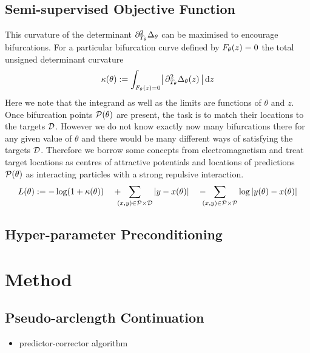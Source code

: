 \subsection{Semi-supervised Objective Function}

This curvature of the determinant $\partial_{T_{\theta}}^2\Delta_{\theta}$ can be maximised to encourage bifurcations. For a particular bifurcation curve defined by $F_{\theta}(z)=0$ the total unsigned determinant curvature
\begin{align}
    \kappa(\theta) := \int_{F_{\theta}(z)=0}\!
    \big|\,\partial_{T_{\theta}}^2\Delta_{\theta}(z)\,\big|
    \,\mathrm{d}z
\end{align}
Here we note that the integrand as well as the limits are functions of $\theta$ and $z$. Once bifurcation points $\mathcal{P}(\theta)$ are present, the task is to match their locations to the targets $\mathcal{D}$. However we do not know exactly now many bifurcations there for any given value of $\theta$ and there would be many different ways of satisfying the targets $\mathcal{D}$. Therefore we borrow some concepts from electromagnetism and treat target locations as centres of attractive potentials and locations of predictions $\mathcal{P}(\theta)$ as interacting particles with a strong repulsive interaction.
\begin{align}
    L(\theta):=
    -\log(1+\kappa(\theta)) \quad +
    \!\!\!\!
    \sum_{(x,y)\in\predictions\times\targets}
    |y-x(\theta)| \quad -
    \!\!\!\!
    \sum_{(x,y)\in\predictions\times\predictions}
    \log|y(\theta)-x(\theta)|
\end{align}

\subsection{Hyper-parameter Preconditioning}


\section{Method}

\subsection{Pseudo-arclength Continuation}
\label{sec:continuation}

\begin{itemize}
    \item predictor-corrector algorithm
    \end{itemize}

